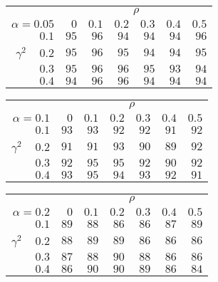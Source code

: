 \begin{tabular}{r|rrrrrr}
\hline\hline
 &\multicolumn{6}{c}{$\rho$} \\ 
 $\alpha = 0.05$ & $0$ & $0.1$ & $0.2$ & $0.3$ & $0.4$ & $0.5$ \\ 
 \hline$0.1$ & $95$ & $96$ & $94$ & $94$ & $94$ & $96$\\ 
$\gamma^2\;\;\;$ $0.2$ & $95$ & $96$ & $95$ & $94$ & $94$ & $95$\\ 
$0.3$ & $95$ & $96$ & $96$ & $95$ & $93$ & $94$\\ 
$0.4$ & $94$ & $96$ & $96$ & $94$ & $94$ & $94$\\ 
 \hline 
 \end{tabular}
 
 \vspace{2em} 
 
\begin{tabular}{r|rrrrrr}
\hline\hline
 &\multicolumn{6}{c}{$\rho$} \\ 
 $\alpha = 0.1$ & $0$ & $0.1$ & $0.2$ & $0.3$ & $0.4$ & $0.5$ \\ 
 \hline$0.1$ & $93$ & $93$ & $92$ & $92$ & $91$ & $92$\\ 
$\gamma^2\;\;\;$ $0.2$ & $91$ & $91$ & $93$ & $90$ & $89$ & $92$\\ 
$0.3$ & $92$ & $95$ & $95$ & $92$ & $90$ & $92$\\ 
$0.4$ & $93$ & $95$ & $94$ & $93$ & $92$ & $91$\\ 
 \hline 
 \end{tabular}
 
 \vspace{2em} 
 
\begin{tabular}{r|rrrrrr}
\hline\hline
 &\multicolumn{6}{c}{$\rho$} \\ 
 $\alpha = 0.2$ & $0$ & $0.1$ & $0.2$ & $0.3$ & $0.4$ & $0.5$ \\ 
 \hline$0.1$ & $89$ & $88$ & $86$ & $86$ & $87$ & $89$\\ 
$\gamma^2\;\;\;$ $0.2$ & $88$ & $89$ & $89$ & $86$ & $86$ & $86$\\ 
$0.3$ & $87$ & $88$ & $90$ & $88$ & $86$ & $86$\\ 
$0.4$ & $86$ & $90$ & $90$ & $89$ & $86$ & $84$\\ 
 \hline 
 \end{tabular}